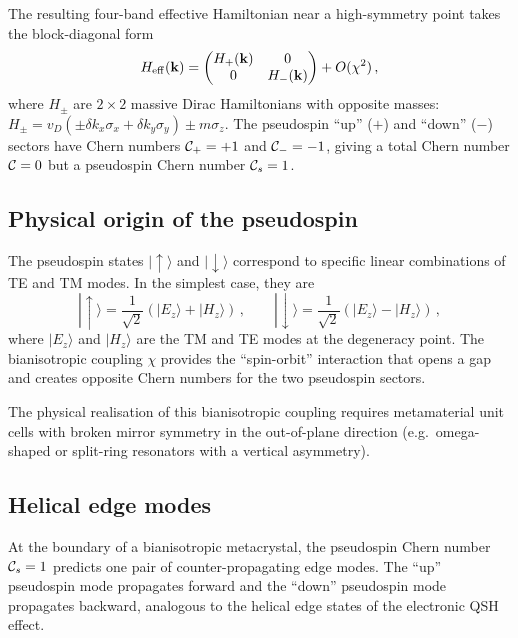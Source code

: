 The resulting four-band effective Hamiltonian near a high-symmetry point
takes the block-diagonal form
\begin{equation}\label{eq:ch11-bianisotropic-H}
  H_{\mathrm{eff}}(\mathbf{k}) = \begin{pmatrix}
    H_+(\mathbf{k}) & 0 \\ 0 & H_-(\mathbf{k})
  \end{pmatrix} + O(\chi^2)\,,
\end{equation}
where $H_\pm$ are $2\times 2$ massive Dirac Hamiltonians with opposite
masses: $H_\pm=v_D(\pm\delta k_x\sigma_x+\delta k_y\sigma_y)
\pm m\sigma_z$.  The pseudospin ``up'' ($+$) and ``down'' ($-$) sectors
have Chern numbers $\mathcal{C}_+=+1$ and $\mathcal{C}_-=-1$, giving a total
Chern number $\mathcal{C}=0$ but a pseudospin Chern number $\mathcal{C}_s=1$.

\subsection{Physical origin of the pseudospin}
\label{sec:ch11-pseudospin-origin}

The pseudospin states $|\uparrow\rangle$ and $|\downarrow\rangle$
correspond to specific linear combinations of TE and TM modes.  In the
simplest case, they are
\begin{equation}\label{eq:ch11-pseudospin-states}
  |\uparrow\rangle = \frac{1}{\sqrt{2}}(|E_z\rangle + |H_z\rangle)\,,
  \qquad
  |\downarrow\rangle = \frac{1}{\sqrt{2}}(|E_z\rangle - |H_z\rangle)\,,
\end{equation}
where $|E_z\rangle$ and $|H_z\rangle$ are the TM and TE modes at the
degeneracy point.  The bianisotropic coupling $\chi$ provides the
``spin-orbit'' interaction that opens a gap and creates opposite Chern
numbers for the two pseudospin sectors.

The physical realisation of this bianisotropic coupling requires
metamaterial unit cells with broken mirror symmetry in the
out-of-plane direction (e.g.\ omega-shaped or split-ring resonators
with a vertical asymmetry).

\subsection{Helical edge modes}
\label{sec:ch11-helical}

At the boundary of a bianisotropic metacrystal, the pseudospin Chern
number $\mathcal{C}_s=1$ predicts one pair of counter-propagating edge modes.
The ``up'' pseudospin mode propagates forward and the ``down'' pseudospin
mode propagates backward, analogous to the helical edge states of the
electronic QSH effect.

